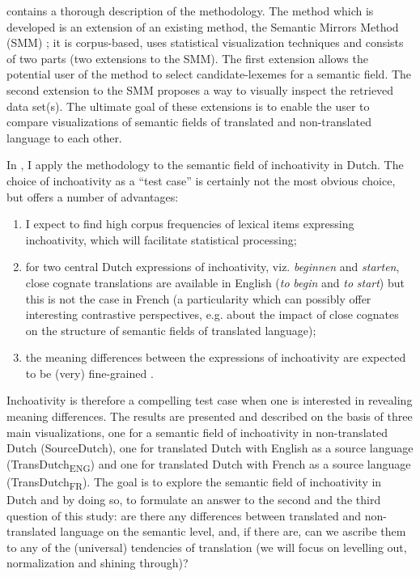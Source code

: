  contains a thorough description of the methodology. The method which is developed is an extension of an existing method, the Semantic Mirrors Method (SMM) \citep{johansson_translational_1998, aijmer_translations_2004, langemets_translations_2005}; it is corpus-based, uses statistical visualization techniques and consists of two parts (two extensions to the SMM). The first extension allows the potential user of the method to select candidate-lexemes for a semantic field. The second extension to the SMM proposes a way to visually inspect the retrieved data set(s). The ultimate goal of these extensions is to enable the user to compare visualizations of semantic fields of translated and non-translated language to each other.

In , I apply the methodology to the semantic field of inchoativity in Dutch. The choice of inchoativity as a ``test case'' is certainly not the most obvious choice, but offers a number of advantages: 

\begin{enumerate}
\item I expect to find high corpus frequencies of lexical items expressing inchoativity, which will facilitate statistical processing; 
\item for two central Dutch expressions of inchoativity, viz. \textit{beginnen} and \textit{starten}, close cognate translations are available in English (\textit{to} \textit{begin} and \textit{to} \textit{start}) but this is not the case in French (a particularity which can possibly offer interesting contrastive perspectives, e.g. about the impact of close cognates on the structure of semantic fields of translated language); 
\item the meaning differences between the expressions of inchoativity are expected to be (very) fine-grained \citep{schmid_introspection_1996}. 
\end{enumerate}

Inchoativity is therefore a compelling test case when one is interested in revealing meaning differences. The results are presented and described on the basis of three main visualizations, one for a semantic field of inchoativity in non-translated Dutch (SourceDutch), one for translated Dutch with English as a source language (TransDutch\textsubscript{ENG}) and one for translated Dutch with French as a source language (TransDutch\textsubscript{FR}). The goal is to explore the semantic field of inchoativity in Dutch and by doing so, to formulate an answer to the second and the third question of this study: are there any differences between translated and non-translated language on the semantic level, and, if there are, can we ascribe them to any of the (universal) tendencies of translation (we will focus on levelling out, normalization and shining through)?

